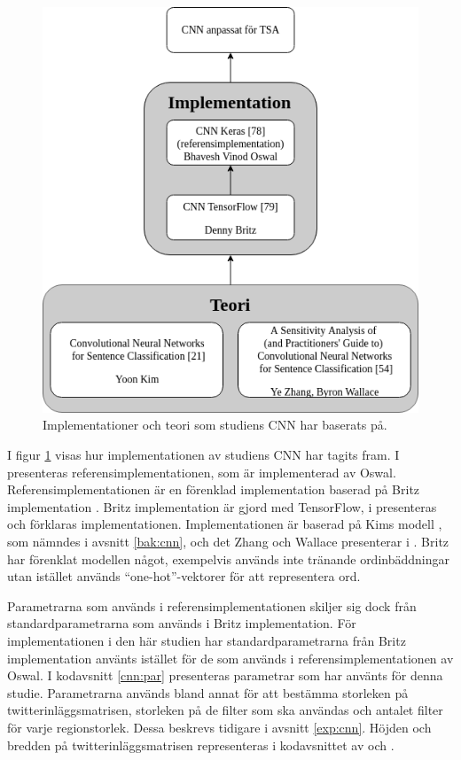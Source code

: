 \documentclass{kaumasters} %
\begin{document}
\begin{figure}[H]
\includegraphics[width=12cm]{cnn_imp}
\centering
\caption{Implementationer och teori som studiens CNN har baserats på.}
\label{fig:cnnimpl}
\end{figure}


I figur \ref{fig:cnnimpl} visas hur implementationen av studiens CNN har tagits fram. 
I \cite{impcnn:003} presenteras referensimplementationen, som är implementerad av Oswal. Referensimplementationen är en förenklad implementation baserad på Britz implementation \cite{impcnn:002}. Britz implementation är gjord med TensorFlow, i \cite{impcnn:001} presenteras och förklaras implementationen.  Implementationen är baserad på Kims modell \cite{cnn:003}, som nämndes i avsnitt \ref{bak:cnn}, och det Zhang och Wallace presenterar i \cite{cnn:002}. Britz har förenklat modellen något, exempelvis används inte tränande ordinbäddningar utan istället används “one-hot”-vektorer för att representera ord.

Parametrarna som används i referensimplementationen skiljer sig dock från standardparametrarna som används i Britz implementation. För implementationen i den här studien har standardparametrarna från Britz implementation använts istället för de som används i referensimplementationen av Oswal. I kodavsnitt \ref{cnn:par} presenteras parametrar som har använts för denna studie. Parametrarna används bland annat för att bestämma storleken på twitterinläggsmatrisen, storleken på de filter som ska användas och antalet filter för varje regionstorlek. Dessa beskrevs tidigare i avsnitt \ref{exp:cnn}. Höjden och bredden på twitterinläggsmatrisen representeras i kodavsnittet av  och .
\end{document}
